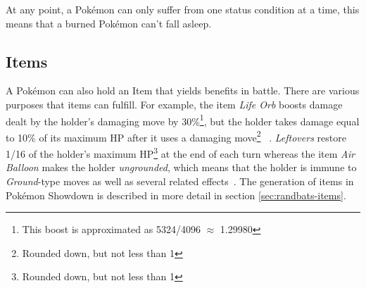 At any point, a Pokémon can only suffer from one status condition at a time, this means that a 
burned Pokémon can't fall asleep.

\subsection{Items}
\label{sec:items}
A Pokémon can also hold an Item that yields benefits in battle. There are various purposes that items 
can fulfill. For example, the item \textit{Life Orb} boosts damage dealt by the holder's damaging move
by 30\%\footnote{This boost is approximated as 5324/4096 $\approx$ 1.29980}, but the holder takes
damage equal to 10\% of its maximum \ac{HP} after it uses a damaging move\footnote{Rounded down, 
but not less than 1} ~\autocite{Bulbapedia:LifeOrb}. \textit{Leftovers} restore 1/16 of the holder's
maximum \ac{HP}\footnote{Rounded down, but not less than 1} at the end of each turn whereas the item
\textit{Air Balloon} makes the holder \textit{ungrounded}, which means that the holder is immune to
\textit{Ground}-type moves as well as several related effects~\autocite{Bulbapedia:AirBalloon}. The 
generation of items in Pokémon Showdown is described in more detail in section \ref{sec:randbats-items}.
